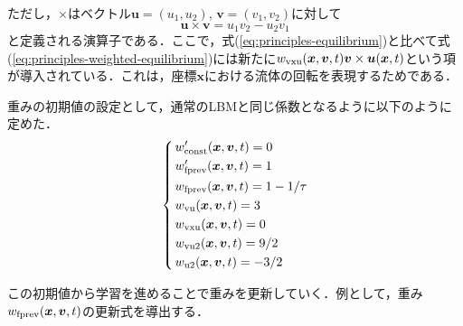 ただし，$\times$はベクトル$\bm{u} = (u_1, u_2)$, $\bm{v} = (v_1, v_2)$に対して
\begin{equation}
  \bm{u} \times \bm{v} = u_1 v_2 - u_2 v_1
  \label{eq:cross-product}
\end{equation}
と定義される演算子である．ここで，式(\ref{eq:principles-equilibrium})と比べて式(\ref{eq:principles-weighted-equilibrium})には新たに$w_{\rm{vxu}}(\bm{x}, \bm{v}, t)\bm{v} \times \bm{u}(\bm{x}, t)$という項が導入されている．これは，座標$\bm{x}$における流体の回転を表現するためである．

重みの初期値の設定として，通常のLBMと同じ係数となるように以下のように定めた．
\begin{equation}
  \left\{ \,
      \begin{aligned}
      & w'_{\rm{const}}(\bm{x}, \bm{v}, t) = 0 \\
      & w'_{\rm{fprev}}(\bm{x}, \bm{v}, t) = 1 \\
      & w_{\rm{fprev}}(\bm{x}, \bm{v}, t) = 1 - 1/\tau \\
      & w_{\rm{vu}}(\bm{x}, \bm{v}, t) = 3 \\
      & w_{\rm{vxu}}(\bm{x}, \bm{v}, t) = 0 \\
      & w_{\rm{vu2}}(\bm{x}, \bm{v}, t) = 9/2 \\
      & w_{\rm{u2}}(\bm{x}, \bm{v}, t) = -3/2
      \end{aligned}
  \right.
\end{equation}

この初期値から学習を進めることで重みを更新していく．例として，重み$w_{\rm{fprev}}(\bm{x}, \bm{v}, t)$の更新式を導出する．
